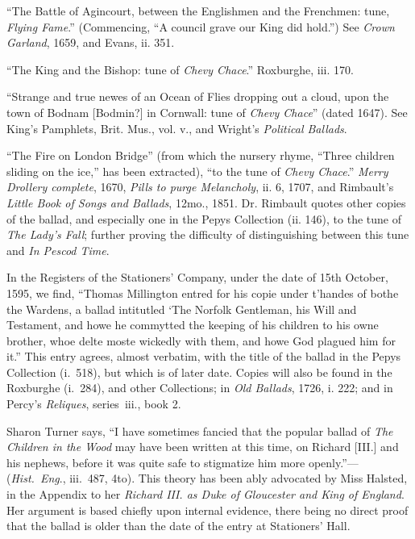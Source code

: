 “The Battle of Agincourt, between the Englishmen and the Frenchmen: tune,
\textit{Flying Fame}.” (Commencing, “A council grave our King did hold.”) See
\textit{Crown Garland}, 1659, and Evans, ii. 351.

“The King and the Bishop: tune of \textit{Chevy Chace}.” Roxburghe, iii. 170.

“Strange and true newes of an Ocean of Flies dropping out a cloud, upon the
town of Bodnam [Bodmin?] in Cornwall: tune of \textit{Chevy Chace}” (dated 1647).
See King’s Pamphlets, Brit. Mus., vol. v., and Wright’s \textit{Political Ballads}.

“The Fire on London Bridge” (from which the nursery rhyme, “Three
children sliding on the ice,” has been extracted), “to the tune of \textit{Chevy Chace}.”
\textit{Merry Drollery complete}, 1670, \textit{Pills to purge Melancholy}, ii. 6, 1707, and
Rimbault’s \textit{Little Book of Songs and Ballads}, 12mo., 1851. Dr. Rimbault quotes
other copies of the ballad, and especially one in the Pepys Collection (ii. 146),
to the tune of \textit{The Lady's Fall}; further proving the difficulty of distinguishing
between this tune and \textit{In Pescod Time}.



\pagebreak


In the Registers of the Stationers’ Company, under the date of 15th October,
1595, we find, “Thomas Millington entred for his copie under t’handes of bothe
the Wardens, a ballad intitutled ‘The Norfolk Gentleman, his Will and Testament,
and howe he commytted the keeping of his children to his owne brother, whoe delte
moste wickedly with them, and howe God plagued him for it.” This entry agrees,
almost verbatim, with the title of the ballad in the Pepys Collection (i.~518),
but which is of later date. Copies will also be found in the Roxburghe (i.~284),
and other Collections; in \textit{Old Ballads}, 1726, i. 222; and in Percy’s \textit{Reliques},
series~iii., book 2.

Sharon Turner says, “I have sometimes fancied that the popular ballad of
\textit{The Children in the Wood} may have been written at this time, on Richard [III.]
and his nephews, before it was quite safe to stigmatize him more openly.”—
(\textit{Hist.~Eng}., iii.~487, 4to). This theory has been ably advocated by Miss
Halsted, in the Appendix to her \textit{Richard III. as Duke of Gloucester and King of
England}. Her argument is based chiefly upon internal evidence, there being no
direct proof that the ballad is older than the date of the entry at Stationers’ Hall.

